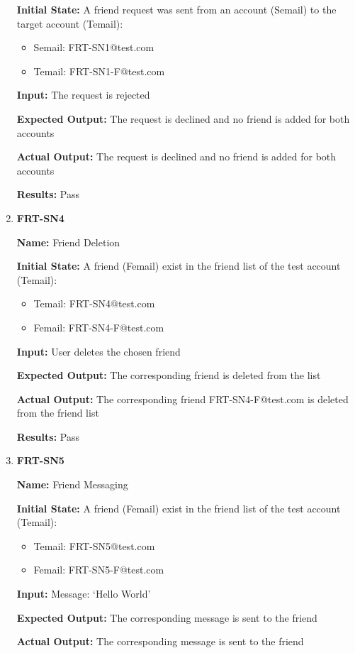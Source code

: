 \documentclass[12pt, titlepage]{article}
\begin{document}
\begin{enumerate}
\textbf{Initial State:} A friend request was sent from an account (Semail) to the target account (Temail):
\begin{itemize}
\item Semail: FRT-SN1@test.com
\item Temail: FRT-SN1-F@test.com
\end{itemize}

\textbf{Input:} The request is rejected
					
\textbf{Expected Output:} The request is declined and no friend is added for both accounts

\textbf{Actual Output:} The request is declined and no friend is added for both accounts

\textbf{Results:} Pass

\item \textbf{FRT-SN4}

\textbf{Name:} Friend Deletion

\textbf{Initial State:} A friend (Femail) exist in the friend list of the test account (Temail):
\begin{itemize}
\item Temail: FRT-SN4@test.com
\item Femail: FRT-SN4-F@test.com
\end{itemize}

\textbf{Input:} User deletes the chosen friend
					
\textbf{Expected Output:} The corresponding friend is deleted from the list

\textbf{Actual Output:} The corresponding friend FRT-SN4-F@test.com is deleted from the friend list

\textbf{Results:} Pass

\item \textbf{FRT-SN5}

\textbf{Name:} Friend Messaging

\textbf{Initial State:} A friend (Femail) exist in the friend list of the test account (Temail):
\begin{itemize}
\item Temail: FRT-SN5@test.com
\item Femail: FRT-SN5-F@test.com
\end{itemize}

\textbf{Input:} Message: `Hello World'
					
\textbf{Expected Output:} The corresponding message is sent to the friend

\textbf{Actual Output:} The corresponding message is sent to the friend


\end{enumerate}
\end{document}
